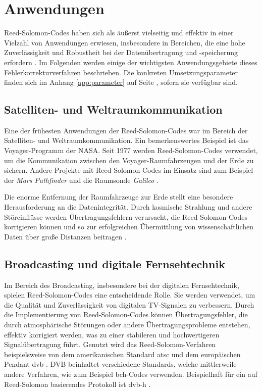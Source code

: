\chapter{Anwendungen}\label{ch:application}

Reed-Solomon-Codes haben sich als äußerst vielseitig und effektiv in einer Vielzahl von Anwendungen erwiesen, insbesondere in Bereichen, die eine hohe Zuverlässigkeit und Robustheit bei der Datenübertragung und -speicherung erfordern \cite{WasIstReedSolomonVerfahren2022}. 
Im Folgenden werden einige der wichtigsten Anwendungsgebiete dieses Fehlerkorrekturverfahren beschrieben.
Die konkreten Umsetzungsparameter finden sich im Anhang \ref{app:parameter} auf Seite \pageref{app:parameter}, sofern sie verfügbar sind.

\section{Satelliten- und Weltraumkommunikation}

Eine der frühesten Anwendungen der Reed-Solomon-Codes war im Bereich der Satelliten- und Weltraumkommunikation. 
Ein bemerkenswertes Beispiel ist das Voyager-Programm der \mbox{NASA}. Seit 1977 werden Reed-Solomon-Codes verwendet, um die Kommunikation zwischen den Voyager-Raumfahrzeugen und der Erde zu sichern. 
Andere Projekte mit Reed-Solomon-Codes im Einsatz sind zum Beispiel der \textit{Mars Pathfinder} und die Raumsonde \textit{Galileo} \cite{wickerReedSolomonCodes1994}.

Die enorme Entfernung der Raumfahrzeuge zur Erde stellt eine besondere Herausforderung an die Datenintegrität. 
Durch kosmische Strahlung und andere Störeinflüsse werden Übertragungsfehlern verursacht, die Reed-Solomon-Codes korrigieren können und  so zur erfolgreichen Übermittlung von wissenschaftlichen Daten über große Distanzen beitragen \cite{ludwigVoyagerTelecommunications2002}.

\section{Broadcasting und digitale Fernsehtechnik}

Im Bereich des Broadcasting, insbesondere bei der digitalen Fernsehtechnik, spielen Reed-Solomon-Codes eine entscheidende Rolle. 
Sie werden verwendet, um die Qualität und Zuverlässigkeit von digitalen TV-Signalen zu verbessern. 
Durch die Implementierung von Reed-Solomon-Codes können Übertragungsfehler, die durch atmosphärische Störungen oder andere Übertragungsprobleme entstehen, effektiv korrigiert werden, was zu einer stabileren und hochwertigeren Signalübertragung führt.
Genutzt wird das Reed-Solomon-Verfahren beispielsweise von dem amerikanischen Standard \acrfull{atsc} und dem europäischen Pendant \acrfull{dvb} \cite{ilievAnalysisEvaluationReedSolomon2008}.
DVB beinhaltet verschiedene Standards, welche mittlerweile andere Verfahren, wie zum Beispiel \acrshort{bch}-Codes verwenden. 
Beispielhaft für ein auf Reed-Solomon basierendes Protokoll ist \acrshort{dvb-h} \cite{DVBH2024}. 

